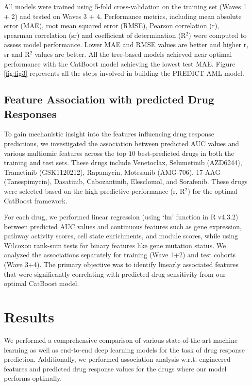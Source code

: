\documentclass[pdflatex,sn-mathphys-num]{sn-jnl}%
\theoremstyle{thmstyleone}%
\theoremstyle{thmstyletwo}%
\theoremstyle{thmstylethree}%
\begin{document}
All models were trained using 5-fold cross-validation on the training set (Waves 1 + 2) and tested on Waves 3 + 4. Performance metrics, including mean absolute error (MAE), root mean squared error (RMSE), Pearson correlation (r), spearman correlation (sr) and coefficient of determination (R$^2$) were computed to assess model performance. Lower MAE and RMSE values are better and higher r, sr and R$^2$ values are better.  All the tree-based models achieved near optimal performance with the CatBoost model achieving the lowest test MAE. Figure \ref{fig:fig3} represents all the steps involved in building the PREDICT-AML model.
\subsection{Feature Association with predicted Drug Responses}
To gain mechanistic insight into the features influencing drug response predictions, we investigated the association between predicted AUC values and various multiomic features across the top $10$ best-predicted drugs in both the training and test sets. These drugs include Venetoclax, Selumetinib (AZD6244), Trametinib (GSK1120212), Rapamycin, Motesanib (AMG-706), 17-AAG (Tanespimycin), Dasatinib, Cabozantinib, Elesclomol, and Sorafenib. These drugs were selected based on the high predictive performance (r, R$^2$) for the optimal CatBoost framework.

For each drug, we performed linear regression (using `lm' function in R v4.3.2) between predicted AUC values and continuous features such as gene expression, pathway activity scores, cell state enrichments, and module scores, while using Wilcoxon rank-sum tests for binary features like gene mutation status. We analyzed the associations separately for training (Wave 1+2) and test cohorts (Wave 3+4). The primary objective was to identify linearly associated features that were significantly correlating with predicted drug sensitivity from our optimal CatBoost model.
\section{Results}
We performed a comprehensive comparison of various state-of-the-art machine learning as well as end-to-end deep learning models for the task of drug response prediction. Additionally, we performed association analysis w.r.t. engineered features and predicted drug response values for the drugs where our model performs optimally.
\end{document}
